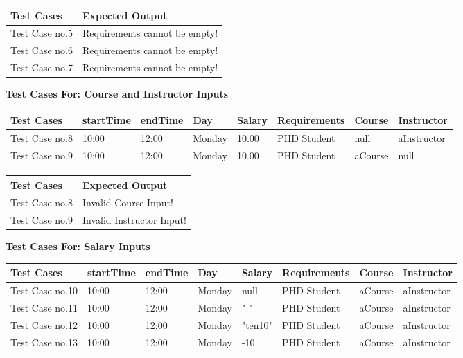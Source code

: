 \documentclass[12pt]{report}
\begin{document}
	\begin{flushleft}
		\begin{tabular}{ | l | l | }
			\hline
			Test Cases & Expected Output \\ \hline
			Test Case no.5 & Requirements cannot be empty! \\ \hline
			Test Case no.6 & Requirements cannot be empty! \\ \hline
			Test Case no.7 & Requirements cannot be empty! \\ \hline
		\end{tabular}
	\end{flushleft}

	\textbf{Test Cases For: Course and Instructor Inputs}
	\begin{flushleft}
		\begin{tabular}{ | l | l | l | l | l | l | l | l | }
			\hline
			Test Cases & startTime & endTime & Day & Salary & Requirements & Course & Instructor \\ \hline
			Test Case no.8 & 10:00 & 12:00 & Monday & 10.00 & PHD Student & null & aInstructor \\ \hline
			Test Case no.9 & 10:00 & 12:00 & Monday & 10.00 & PHD Student & aCourse & null \\ \hline
		\end{tabular}
	\end{flushleft}
	
	\begin{flushleft}
		\begin{tabular}{ | l | l | }
			\hline
			Test Cases & Expected Output \\ \hline
			Test Case no.8 & Invalid Course Input! \\ \hline
			Test Case no.9 & Invalid Instructor Input! \\ \hline
		\end{tabular}
	\end{flushleft}

	\newpage
	\textbf{Test Cases For: Salary Inputs}
	\begin{flushleft}
		\begin{tabular}{ | l | l | l | l | l | l | l | l | }
			\hline
			Test Cases & startTime & endTime & Day & Salary & Requirements & Course & Instructor \\ \hline
			Test Case no.10 & 10:00 & 12:00 & Monday & null & PHD Student & aCourse & aInstructor \\ \hline
			Test Case no.11 & 10:00 & 12:00 & Monday & " " & PHD Student & aCourse & aInstructor \\ \hline
			Test Case no.12 & 10:00 & 12:00 & Monday & "ten10" & PHD Student & aCourse & aInstructor \\ \hline
			Test Case no.13 & 10:00 & 12:00 & Monday & -10 & PHD Student & aCourse & aInstructor \\ \hline
		\end{tabular}
	\end{flushleft}
	
\end{document}
